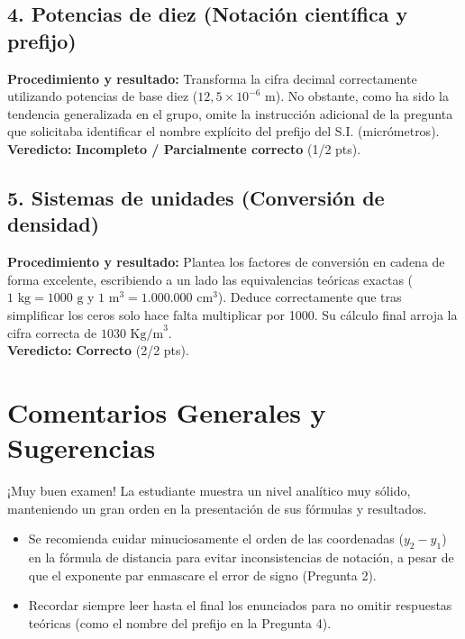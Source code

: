 \documentclass[12pt]{article}
\begin{document}
\subsection*{4. Potencias de diez (Notación científica y prefijo)}
\textbf{Procedimiento y resultado:} Transforma la cifra decimal correctamente utilizando potencias de base diez ($12,5 \times 10^{-6}$ m). No obstante, como ha sido la tendencia generalizada en el grupo, omite la instrucción adicional de la pregunta que solicitaba identificar el nombre explícito del prefijo del S.I. (micrómetros). \\
\textbf{Veredicto:} \textbf{Incompleto / Parcialmente correcto} (1/2 pts).

\subsection*{5. Sistemas de unidades (Conversión de densidad)}
\textbf{Procedimiento y resultado:} Plantea los factores de conversión en cadena de forma excelente, escribiendo a un lado las equivalencias teóricas exactas ($1 \text{ kg} = 1000 \text{ g}$ y $1 \text{ m}^3 = 1.000.000 \text{ cm}^3$). Deduce correctamente que tras simplificar los ceros solo hace falta multiplicar por 1000. Su cálculo final arroja la cifra correcta de $1030 \text{ Kg/m}^3$. \\
\textbf{Veredicto:} \textbf{Correcto} (2/2 pts).

\vspace{0.5cm}
\section*{Comentarios Generales y Sugerencias}
¡Muy buen examen! La estudiante muestra un nivel analítico muy sólido, manteniendo un gran orden en la presentación de sus fórmulas y resultados.
\begin{itemize}
    \item Se recomienda cuidar minuciosamente el orden de las coordenadas ($y_2 - y_1$) en la fórmula de distancia para evitar inconsistencias de notación, a pesar de que el exponente par enmascare el error de signo (Pregunta 2).
    \item Recordar siempre leer hasta el final los enunciados para no omitir respuestas teóricas (como el nombre del prefijo en la Pregunta 4).
\end{itemize}
\end{document}
